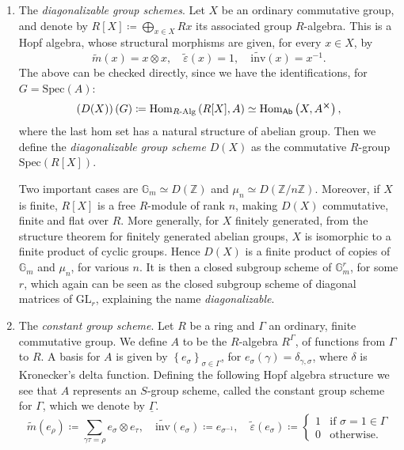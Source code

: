 \begin{ex}
\begin{enumerate}
		\item The {\em diagonalizable group schemes}. Let $X$ be an ordinary
			commutative group, and denote by $R[X] \coloneqq \bigoplus_{x \in X} Rx$
			its associated group $R$-algebra.
			This is a Hopf algebra, whose structural morphisms
			are given, for every $x \in X$, by
			\begin{equation*}
				\widetilde{m}(x) = x \otimes x,
				\quad
				\widetilde{\varepsilon}(x) = 1,
				\quad
				\widetilde{\mathrm{inv}}(x) = x^{-1}
			.\end{equation*} 
			The above can be checked directly, since we have
			the identifications, for $G = \mathrm{Spec}(A)$:
			\begin{equation*}
				\left( D(X) \right)(G) \coloneqq
				\mathrm{Hom}_{R \text{-Alg}} \left( R[X], A \right) \simeq
				\mathrm{Hom}_{\mathsf{Ab}} \left( X, A^{\cross} \right)
			,\end{equation*} 
			where the last hom set has a natural structure of abelian
			group.
			Then we define the {\em diagonalizable group scheme} $D(X)$
			as the commutative $R$-group $\mathrm{Spec}(R[X])$.

			Two important cases are $\mathbb{G}_m \simeq D(\mathbb{Z})$
			and $\mu_n \simeq D(\mathbb{Z}/n\mathbb{Z})$.
			Moreover, if $X$ is finite, $R[X]$ is a free $R$-module of rank $n$,
			making $D(X)$ commutative, finite and flat over $R$.
			More generally, for $X$ finitely generated, 
			from the structure theorem for finitely generated abelian groups, 
			$X$ is isomorphic to a finite product of cyclic groups.
			Hence $D(X)$ is a finite product of copies of $\mathbb{G}_m$
			and $\mu_n$, for various $n$.
			It is then a closed subgroup scheme of $\mathbb{G}_m^r$, for some $r$,
			which again can be seen as the closed subgroup scheme of diagonal
			matrices of $\mathrm{GL}_r$, explaining the name 
			{\em diagonalizable}.


		\item The {\em constant group scheme}\label{ex:ConstantGroups}.
			Let $R$ be a ring and $\Gamma$ an ordinary, finite commutative group.
			We define $A$ to be the $R$-algebra $R^\Gamma$,
			of functions from $\Gamma$ to $R$.
			A basis for $A$ is given by $\left\{ e_\sigma \right\}_{\sigma \in \Gamma}$,
			for $e_\sigma(\gamma) = \delta_{\gamma,\sigma}$,
			where $\delta$ is Kronecker's delta function.
			Defining the following Hopf algebra structure
			we see that $A$ represents an $S$-group scheme,
			called the constant group scheme for $\Gamma$,
			which we denote by $\underline{\Gamma}$.
			\begin{equation*}
				\widetilde{m}(e_\rho) \coloneqq
				\sum_{\gamma\tau = \rho}^{} e_\sigma \otimes e_\tau, 
				\quad
				\widetilde{\mathrm{inv}}(e_\sigma) \coloneqq e_{\sigma^{-1}}, 
				\quad
				\widetilde{\varepsilon}(e_\sigma) \coloneqq
				\begin{cases}
					1 & \text{if } \sigma = 1 \in \Gamma\\
					0 & \text{otherwise}.
				\end{cases}
			\end{equation*}



\end{enumerate}
\end{ex}
